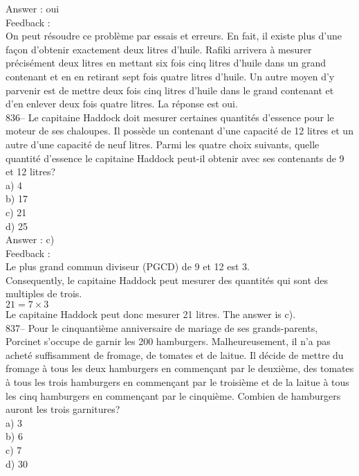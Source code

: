 \documentclass[letterpaper, 12pt]{article}
\begin{document}
Answer : oui\\

Feedback : \\
On peut r\'esoudre ce probl\`eme par essais et erreurs. En fait, il
existe plus d'une fa\c con d'obtenir exactement deux litres d'huile.
Rafiki arrivera \`a mesurer pr\'ecis\'ement deux litres en mettant
six fois cinq litres d'huile dans un grand contenant et en en
retirant sept fois quatre litres d'huile.  Un autre moyen d'y
parvenir est de mettre deux fois cinq litres d'huile
dans le grand contenant et d'en enlever deux fois quatre litres. La
r\'eponse est oui.\\

836-- Le capitaine Haddock doit mesurer certaines quantit\'es d'essence pour
le moteur de ses chaloupes.  Il poss\`ede un contenant d'une capacit\'e de
12 litres et un autre d'une capacit\'e de neuf litres.  Parmi les quatre
choix suivants, quelle quantit\'e d'essence le capitaine Haddock peut-il
obtenir avec ses contenants de 9 et 12 litres?\\
a) 4\\
b) 17\\
c) 21\\
d) 25\\

Answer : c)\\

Feedback : \\
Le plus grand commun diviseur (PGCD) de 9 et 12 est 3. \\
Consequently, le capitaine Haddock peut mesurer des quantit\'es qui sont
des multiples de trois.  \\
$21=7\times3$\\
Le capitaine Haddock peut donc mesurer 21 litres.  The answer is c).\\

837-- Pour le cinquanti\`eme anniversaire de mariage de ses grands-parents,
Porcinet s'occupe de garnir les 200 hamburgers.  Malheureusement, il n'a pas
achet\'e suffisamment de fromage, de tomates et de laitue.  Il d\'ecide de
mettre du fromage \`a tous les deux hamburgers en commen\c cant par le
deuxi\`eme, des tomates \`a tous les trois hamburgers en commen\c cant par
le troisi\`eme et de la laitue \`a tous les cinq hamburgers en commen\c cant
par le cinqui\`eme.  Combien de hamburgers auront les trois garnitures?\\
a) 3\\
b) 6\\
c) 7\\
d) 30\\
\end{document}

